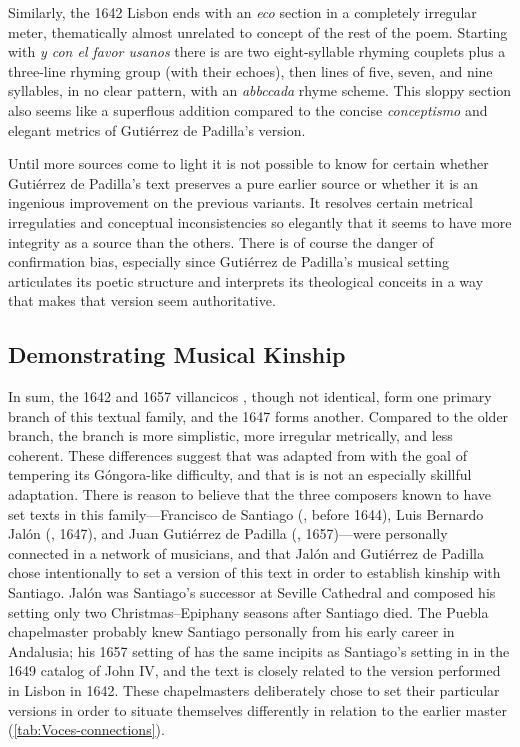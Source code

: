 Similarly, the 1642 Lisbon  ends with an \emph{eco} section in a
completely irregular meter, thematically almost unrelated to concept of the rest
of the poem.
Starting with \emph{y con el favor usanos} there is are two eight-syllable
rhyming couplets plus a three-line rhyming group (with their echoes), then lines
of five, seven, and nine syllables, in no clear pattern, with an \emph{abbccada}
rhyme scheme.
This sloppy section also seems like a superflous addition compared to the
concise \emph{conceptismo} and elegant metrics of Gutiérrez de Padilla's
version.

Until more sources come to light it is not possible to know for certain whether
Gutiérrez de Padilla's text preserves a pure earlier source or whether it is an
ingenious improvement on the previous variants.
It resolves certain metrical irregulaties and conceptual inconsistencies so
elegantly that it seems to have more integrity as a source than the others.
There is of course the danger of confirmation bias, especially since Gutiérrez
de Padilla's musical setting articulates its poetic structure and interprets its
theological conceits in a way that makes that version seem authoritative.


\subsection{Demonstrating Musical Kinship}

In sum, the 1642 and 1657 villancicos , though
not identical, form one primary branch of this textual family, and the 1647
 forms another.
Compared to the older  branch, the  branch is
more simplistic, more irregular metrically, and less coherent.
These differences suggest that  was adapted from 
with the goal of tempering its Góngora-like difficulty, and that is is not an
especially skillful adaptation.
There is reason to believe that the three composers known to have set texts in
this family---Francisco de Santiago (, before 1644), Luis Bernardo
Jalón (, 1647), and Juan Gutiérrez de Padilla (,
1657)---were personally connected in a network of musicians, and that Jalón and
Gutiérrez de Padilla chose intentionally to set a version of this text in order
to establish kinship with Santiago.
Jalón was Santiago's successor at Seville Cathedral and composed his
 setting only two Christmas--Epiphany seasons after Santiago
died.
The Puebla chapelmaster probably knew Santiago personally from his early career
in Andalusia; his 1657 setting of  has the same incipits as
Santiago's setting in in the 1649 catalog of John IV, and the text is closely
related to the version performed in Lisbon in 1642.
These chapelmasters deliberately chose to set their particular versions in order
to situate themselves differently in relation to the earlier master
(\cref{tab:Voces-connections}).

